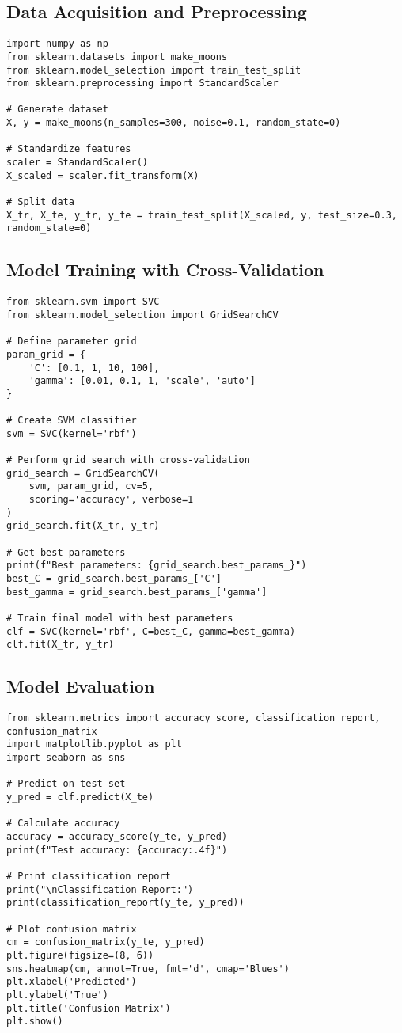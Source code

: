 \documentclass[11pt]{article}
\begin{document}
\subsection{Data Acquisition and Preprocessing}
\begin{lstlisting}
import numpy as np
from sklearn.datasets import make_moons
from sklearn.model_selection import train_test_split
from sklearn.preprocessing import StandardScaler

# Generate dataset
X, y = make_moons(n_samples=300, noise=0.1, random_state=0)

# Standardize features
scaler = StandardScaler()
X_scaled = scaler.fit_transform(X)

# Split data
X_tr, X_te, y_tr, y_te = train_test_split(X_scaled, y, test_size=0.3, random_state=0)
\end{lstlisting}

\subsection{Model Training with Cross-Validation}
\begin{lstlisting}
from sklearn.svm import SVC
from sklearn.model_selection import GridSearchCV

# Define parameter grid
param_grid = {
    'C': [0.1, 1, 10, 100],
    'gamma': [0.01, 0.1, 1, 'scale', 'auto']
}

# Create SVM classifier
svm = SVC(kernel='rbf')

# Perform grid search with cross-validation
grid_search = GridSearchCV(
    svm, param_grid, cv=5, 
    scoring='accuracy', verbose=1
)
grid_search.fit(X_tr, y_tr)

# Get best parameters
print(f"Best parameters: {grid_search.best_params_}")
best_C = grid_search.best_params_['C']
best_gamma = grid_search.best_params_['gamma']

# Train final model with best parameters
clf = SVC(kernel='rbf', C=best_C, gamma=best_gamma)
clf.fit(X_tr, y_tr)
\end{lstlisting}

\subsection{Model Evaluation}
\begin{lstlisting}
from sklearn.metrics import accuracy_score, classification_report, confusion_matrix
import matplotlib.pyplot as plt
import seaborn as sns

# Predict on test set
y_pred = clf.predict(X_te)

# Calculate accuracy
accuracy = accuracy_score(y_te, y_pred)
print(f"Test accuracy: {accuracy:.4f}")

# Print classification report
print("\nClassification Report:")
print(classification_report(y_te, y_pred))

# Plot confusion matrix
cm = confusion_matrix(y_te, y_pred)
plt.figure(figsize=(8, 6))
sns.heatmap(cm, annot=True, fmt='d', cmap='Blues')
plt.xlabel('Predicted')
plt.ylabel('True')
plt.title('Confusion Matrix')
plt.show()
\end{lstlisting}
\end{document}
